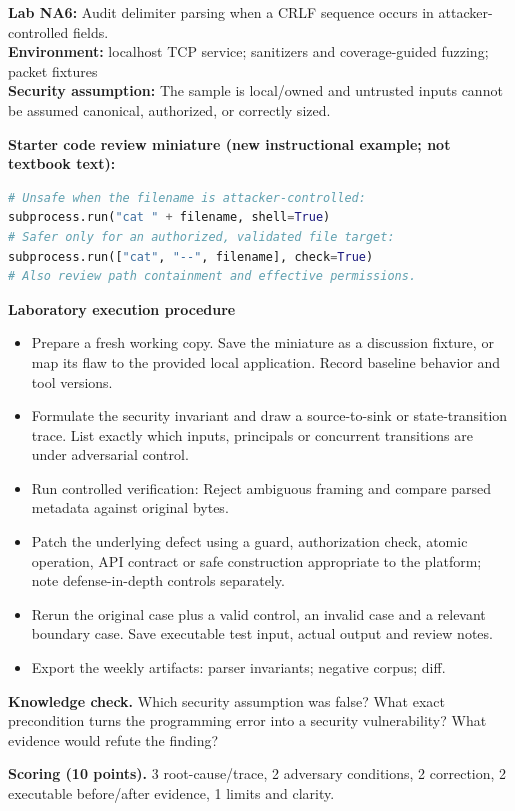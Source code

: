 \documentclass[10pt,letterpaper]{article}
\begin{document}
\begin{insight}\textbf{Lab NA6:} Audit delimiter parsing when a CRLF sequence occurs in attacker-controlled fields.\\\textbf{Environment:} localhost TCP service; sanitizers and coverage-guided fuzzing; packet fixtures\\\textbf{Security assumption:} The sample is local/owned and untrusted inputs cannot be assumed canonical, authorized, or correctly sized.\end{insight}
\textbf{Starter code review miniature (new instructional example; not textbook text):}
\begin{lstlisting}[language=Python]
# Unsafe when the filename is attacker-controlled:
subprocess.run("cat " + filename, shell=True)
# Safer only for an authorized, validated file target:
subprocess.run(["cat", "--", filename], check=True)
# Also review path containment and effective permissions.
\end{lstlisting}
\textbf{Laboratory execution procedure}
\begin{itemize}[leftmargin=*,itemsep=2pt]
\item Prepare a fresh working copy. Save the miniature as a discussion fixture, or map its flaw to the provided local application. Record baseline behavior and tool versions.
\item Formulate the security invariant and draw a source-to-sink or state-transition trace. List exactly which inputs, principals or concurrent transitions are under adversarial control.
\item Run controlled verification: Reject ambiguous framing and compare parsed metadata against original bytes.
\item Patch the underlying defect using a guard, authorization check, atomic operation, API contract or safe construction appropriate to the platform; note defense-in-depth controls separately.
\item Rerun the original case plus a valid control, an invalid case and a relevant boundary case. Save executable test input, actual output and review notes.
\item Export the weekly artifacts: parser invariants; negative corpus; diff.
\end{itemize}
\textbf{Knowledge check.} Which security assumption was false? What exact precondition turns the programming error into a security vulnerability? What evidence would refute the finding?

\textbf{Scoring (10 points).} 3 root-cause/trace, 2 adversary conditions, 2 correction, 2 executable before/after evidence, 1 limits and clarity.
\end{document}

